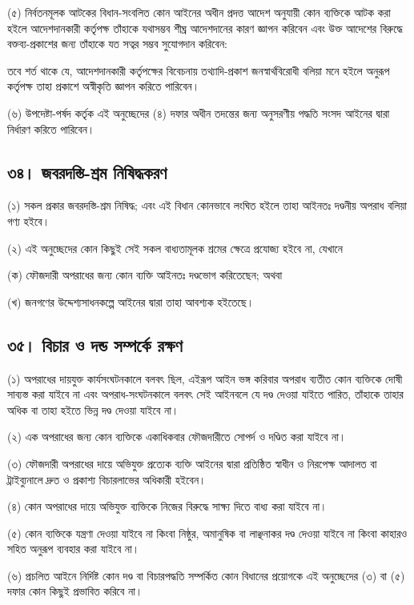 \documentclass[11pt]{article}
\begin{document}
(৫) নির্বতনমূলক আটকের বিধান-সংবলিত কোন আইনের অধীন প্রদত্ত আদেশ অনুযায়ী কোন
    ব্যক্তিকে আটক করা হইলে আদেশদানকারী কর্তৃপক্ষ তাঁহাকে যথাসম্ভব শীঘ্র আদেশদানের
    কারণ জ্ঞাপন করিবেন এবং উক্ত আদেশের বিরুদ্ধে বক্তব্য-প্রকাশের জন্য তাঁহাকে যত
    সত্বর সম্ভব সুযোগদান করিবেন:

তবে শর্ত থাকে যে, আদেশদানকারী কর্তৃপক্ষের বিবেচনায় তথ্যাদি-প্রকাশ
জনস্বার্থবিরোধী বলিয়া মনে হইলে অনুরূপ কর্তৃপক্ষ তাহা প্রকাশে অস্বীকৃতি জ্ঞাপন
করিতে পারিবেন।

(৬) উপদেষ্টা-পর্ষদ কর্তৃক এই অনুচ্ছেদের (৪) দফার অধীন তদন্তের জন্য অনুসরণীয়
    পদ্ধতি সংসদ আইনের দ্বারা নির্ধারণ করিতে পারিবেন।

\subsection{৩৪। জবরদস্তি-শ্রম নিষিদ্ধকরণ}
\label{sec:org54ca948}
(১) সকল প্রকার জবরদস্তি-শ্রম নিষিদ্ধ; এবং এই বিধান কোনভাবে লংঘিত হইলে
    তাহা আইনতঃ দণ্ডনীয় অপরাধ বলিয়া গণ্য হইবে।

(২) এই অনুচ্ছেদের কোন কিছুই সেই সকল বাধ্যতামূলক শ্রমের ক্ষেত্রে প্রযোজ্য হইবে
    না, যেখানে

(ক) ফৌজদারী অপরাধের জন্য কোন ব্যক্তি আইনতঃ দণ্ডভোগ করিতেছেন; অথবা

(খ) জনগণের উদ্দেশ্যসাধনকল্পে আইনের দ্বারা তাহা আবশ্যক হইতেছে।

\subsection{৩৫। বিচার ও দন্ড সম্পর্কে রক্ষণ}
\label{sec:org5f8e137}
(১) অপরাধের দায়যুক্ত কার্যসংঘটনকালে বলবৎ ছিল, এইরূপ আইন ভঙ্গ করিবার অপরাধ
    ব্যতীত কোন ব্যক্তিকে দোষী সাব্যস্ত করা যাইবে না এবং অপরাধ-সংঘটনকালে বলবৎ
    সেই আইনবলে যে দণ্ড দেওয়া যাইতে পারিত, তাঁহাকে তাহার অধিক বা তাহা হইতে
    ভিন্ন দণ্ড দেওয়া যাইবে না।

(২) এক অপরাধের জন্য কোন ব্যক্তিকে একাধিকবার ফৌজদারীতে সোপর্দ ও দণ্ডিত করা
    যাইবে না।

(৩) ফৌজদারী অপরাধের দায়ে অভিযুক্ত প্রত্যেক ব্যক্তি আইনের দ্বারা প্রতিষ্ঠিত
    স্বাধীন ও নিরপেক্ষ আদালত বা ট্রাইব্যুনালে দ্রুত ও প্রকাশ্য বিচারলাভের অধিকারী
    হইবেন।

(৪) কোন অপরাধের দায়ে অভিযুক্ত ব্যক্তিকে নিজের বিরুদ্ধে সাক্ষ্য দিতে বাধ্য করা
    যাইবে না।

(৫) কোন ব্যক্তিকে যন্ত্রণা দেওয়া যাইবে না কিংবা নিষ্ঠুর, অমানুষিক বা লাঞ্ছনাকর
    দণ্ড দেওয়া যাইবে না কিংবা কাহারও সহিত অনুরূপ ব্যবহার করা যাইবে না।

(৬) প্রচলিত আইনে নির্দিষ্ট কোন দণ্ড বা বিচারপদ্ধতি সম্পর্কিত কোন বিধানের
    প্রয়োগকে এই অনুচ্ছেদের (৩) বা (৫) দফার কোন কিছুই প্রভাবিত করিবে না।
\end{document}
